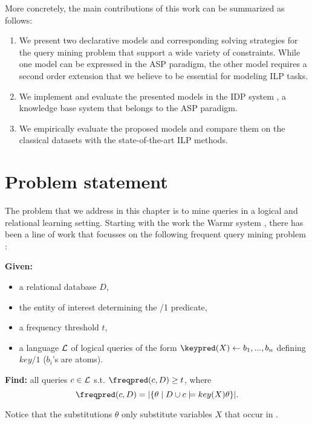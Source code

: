 More concretely, the main contributions of this work can be summarized as follows:
\begin{enumerate}
  \item We present two declarative models and corresponding solving strategies for the query mining problem that support a wide variety of constraints.  While one model can be expressed in the ASP paradigm, the other model requires a  second order extension that we believe
to be essential for modeling ILP tasks. 
  \item We implement and evaluate the presented models in the IDP system \parencite{idp}, a knowledge base system that belongs to the ASP paradigm.
  \item We empirically evaluate the proposed models and compare them on the classical datasets with the state-of-the-art ILP methods.
\end{enumerate}

\section{Problem statement}\label{sec:problem}

The problem that we address in this chapter is to mine queries in a logical and relational learning setting. Starting with the work the Warmr system \parencite{warmr}, there has been a line of work that focusses on the following frequent query mining problem \parencite{bagm,farmer,condensed_luc}:


\noindent
{\bf Given:} \vspace{-8pt}
\begin{itemize}
\item a relational database $D$,
\item the entity of interest determining the \keypred/1 predicate,
\item a frequency threshold $t$,
\item a language ${\cal L}$ of logical queries of the form $\keypred(X) \leftarrow b_1, ..., b_n$ defining $key/1$ ($b_i$'s are atoms).
\end{itemize}\vspace{-5pt}
{\bf Find:} all queries $c \in {\cal L}$ s.t. $\freqpred(c,D) \geq t$, where 
\begin{equation*}
\freqpred(c,D) = |\{\theta \mid D \cup c \models key(X)\theta \}|.
\end{equation*}

Notice that the substitutions $\theta$ only substitute variables $X$ that occur in \keypred. 

